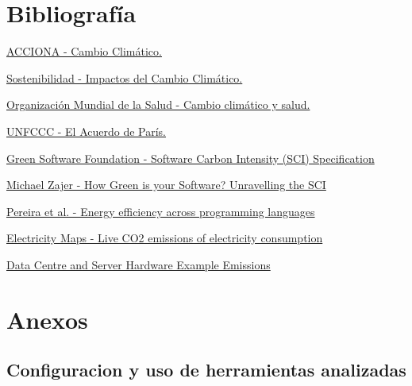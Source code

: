 \documentclass[12pt,a4paper]{report}
\begin{document}
\chapter*{Bibliografía}
\begin{thebibliography}{99}
  \hypertarget{bib:1}{}\href{https://www.acciona.com/es/cambio-climatico}{ACCIONA - Cambio Climático.}

  \hypertarget{bib:2}{}\href{https://www.sostenibilidad.com/cambio-climatico/impactos-cambio-climatico/}{Sostenibilidad - Impactos del Cambio Climático. }

  \hypertarget{bib:3}{}\href{https://www.who.int/es/news-room/fact-sheets/detail/climate-change-and-health}{Organización Mundial de la Salud - Cambio climático y salud. }

  \hypertarget{bib:4}{}\href{https://unfccc.int/es/acerca-de-las-ndc/el-acuerdo-de-paris}{UNFCCC - El Acuerdo de París. }

  \hypertarget{bib:5}{}\href{https://sci.greensoftware.foundation/}{Green Software Foundation - Software Carbon Intensity (SCI) Specification}

  \hypertarget{bib:6}{}\href{https://www.v2.ai/insights/how-green-is-your-software-unravelling-the-software-carbon-intensity}{Michael Zajer - How Green is your Software? Unravelling the SCI}

  \hypertarget{bib:7}{}\href{https://greenlab.di.uminho.pt/wp-content/uploads/2017/10/sleFinal.pdf}{Pereira et al. - Energy efficiency across programming languages}

  \hypertarget{bib:8}{}\href{https://app.electricitymaps.com/map}{Electricity Maps - Live CO2 emissions of electricity consumption}

  \hypertarget{bib:9}{}\href{https://www.techcarbonstandard.org/technology-categories/lifecycle/example/server}{Data Centre and Server Hardware Example Emissions}
\end{thebibliography}

\appendix
\chapter{Anexos}
\section{Configuracion y uso de herramientas analizadas}
\end{document}
